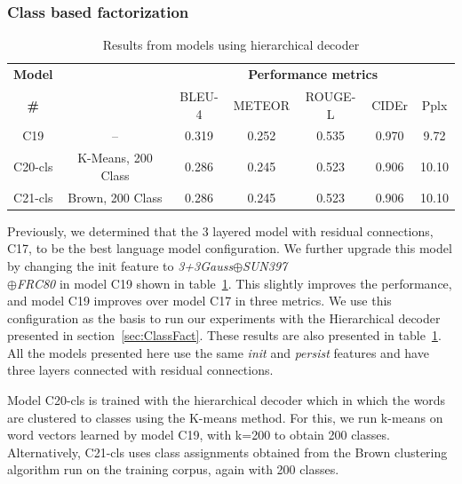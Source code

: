 \subsubsection{Class based factorization}
\begin{table}[htp]
  \centering
  \newcommand{\bs}{\small}
  \begin{adjustbox}{center}
  \begin{tabular}{|c|c|c|c|c|c|c|}
    \hline
    \bf Model & \bf \multirow{2}{*}{Class clustering} & \multicolumn{5}{c|}{\bf Performance metrics}\\
    \cline{3-7}
    \bf \# &\bf &\bs BLEU-4 &\bs METEOR &\bs ROUGE-L &\bs CIDEr&\bs Pplx \\\hline
    C19 & --    & 0.319 & 0.252 & 0.535 & 0.970 & 9.72 \\\hline
    C20-cls &\parbox[c][][c]{4cm}{\smallskip\centering K-Means, 200 Class \smallskip} 
                             & 0.286 & 0.245 & 0.523 & 0.906 & 10.10 \\\hline
    C21-cls &\parbox[c][][c]{4cm}{\smallskip\centering Brown, 200 Class\smallskip} 
                             & 0.286 & 0.245 & 0.523 & 0.906 & 10.10 \\\hline
  \end{tabular}
  \end{adjustbox}
  \caption{Results from models using hierarchical decoder}
  \label{tab:resClsCocValset}
\end{table}

Previously, we determined that the 3 layered model with residual connections,
C17, to be the best language model configuration.
We further upgrade this model by changing the init feature to
\emph{3+3Gauss$\oplus$SUN397\\$\oplus$FRC80} in model C19 shown in
table~\ref{tab:resClsCocValset}.
This slightly improves the performance, and model C19 improves over model C17 in
three metrics. 
We use this configuration as the basis to run our experiments with the
Hierarchical decoder presented in section~\ref{sec:ClassFact}.
These results are also presented in table~\ref{tab:resClsCocValset}.
All the models presented here use the same \emph{init} and \emph{persist}
features and have three layers connected with residual connections.

Model C20-cls is trained with the hierarchical decoder which in which the words
are clustered to classes using the K-means method. 
For this, we run k-means on word vectors learned by model C19, with k=200 to
obtain 200 classes. 
Alternatively, C21-cls uses class assignments obtained from the Brown clustering
algorithm run on the training corpus, again with 200 classes.

